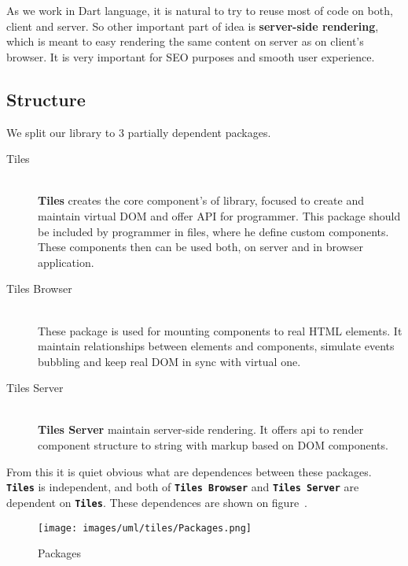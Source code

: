 \documentclass[oneside, 12pt]{book}
\begin{document}
    As we work in Dart language, it is natural to try to reuse most of code on both, client and server.
    So other important part of idea is \textbf{server-side rendering}, 
    which is meant to easy rendering the same content on server as on client's browser.
    It is very important for SEO purposes and smooth user experience. 

  \subsection{Structure}\label{subsec:our-architecture-structure}

    We split our library to 3 partially dependent packages. 
    \begin{description}
      \item[Tiles] \hfill \\
        \textbf{Tiles} creates the core component's of library, focused to create and maintain virtual DOM and offer API for programmer.
        This package should be included by programmer in files, where he define custom components. 
        These components then can be used both, on server and in browser application.
      \item[Tiles Browser] \hfill \\
        These package is used for mounting components to real HTML elements. 
        It maintain relationships between elements and components, 
        simulate events bubbling and keep real DOM in sync with virtual one.
      \item[Tiles Server] \hfill \\
        \textbf{Tiles Server} maintain server-side rendering. It offers api to render component structure to string with markup based on DOM components.
    \end{description}

    From this it is quiet obvious what are dependences between these packages. 
    \texttt{\textbf{Tiles}} is independent, and both of \texttt{\textbf{Tiles Browser}} and \texttt{\textbf{Tiles Server}} are dependent on \texttt{\textbf{Tiles}}.
    These dependences are shown on figure~.

    \begin{figure}[h]
    \centering  
      \texttt{[image: images/uml/tiles/Packages.png]}
      \caption{Packages}
      \label{img:library-packages}
    \end{figure}
\end{document}
